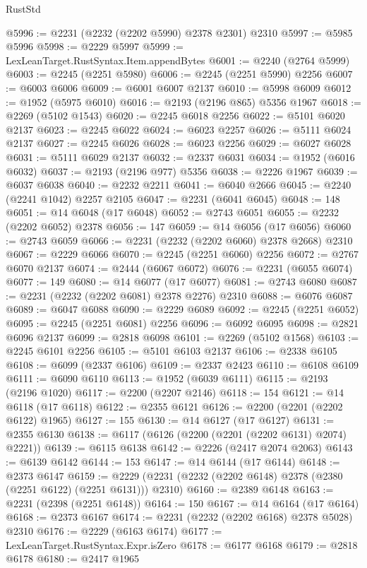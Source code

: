 \begin{lexlean}{RustStd}
\begin{coremodule}
@5996 := @2231 (@2232 (@2202 @5990) @2378 @2301) @2310
@5997 := @5985 @5996
@5998 := @2229 @5997
@5999 := LexLeanTarget.RustSyntax.Item.appendBytes
@6001 := @2240 (@2764 @5999)
@6003 := @2245 (@2251 @5980)
@6006 := @2245 (@2251 @5990) @2256
@6007 := @6003 @6006
@6009 := @6001 @6007 @2137
@6010 := @5998 @6009
@6012 := @1952 (@5975 @6010)
@6016 := @2193 (@2196 @865) @5356 @1967
@6018 := @2269 (@5102 @1543)
@6020 := @2245 @6018 @2256
@6022 := @5101 @6020 @2137
@6023 := @2245 @6022
@6024 := @6023 @2257
@6026 := @5111 @6024 @2137
@6027 := @2245 @6026
@6028 := @6023 @2256
@6029 := @6027 @6028
@6031 := @5111 @6029 @2137
@6032 := @2337 @6031
@6034 := @1952 (@6016 @6032)
@6037 := @2193 (@2196 @977) @5356
@6038 := @2226 @1967
@6039 := @6037 @6038
@6040 := @2232 @2211
@6041 := @6040 @2666
@6045 := @2240 (@2241 @1042) @2257 @2105
@6047 := @2231 (@6041 @6045)
@6048 := 148
@6051 := @14 @6048 (@17 @6048)
@6052 := @2743 @6051
@6055 := @2232 (@2202 @6052) @2378
@6056 := 147
@6059 := @14 @6056 (@17 @6056)
@6060 := @2743 @6059
@6066 := @2231 (@2232 (@2202 @6060) @2378 @2668) @2310
@6067 := @2229 @6066
@6070 := @2245 (@2251 @6060) @2256
@6072 := @2767 @6070 @2137
@6074 := @2444 (@6067 @6072)
@6076 := @2231 (@6055 @6074)
@6077 := 149
@6080 := @14 @6077 (@17 @6077)
@6081 := @2743 @6080
@6087 := @2231 (@2232 (@2202 @6081) @2378 @2276) @2310
@6088 := @6076 @6087
@6089 := @6047 @6088
@6090 := @2229 @6089
@6092 := @2245 (@2251 @6052)
@6095 := @2245 (@2251 @6081) @2256
@6096 := @6092 @6095
@6098 := @2821 @6096 @2137
@6099 := @2818 @6098
@6101 := @2269 (@5102 @1568)
@6103 := @2245 @6101 @2256
@6105 := @5101 @6103 @2137
@6106 := @2338 @6105
@6108 := @6099 (@2337 @6106)
@6109 := @2337 @2423
@6110 := @6108 @6109
@6111 := @6090 @6110
@6113 := @1952 (@6039 @6111)
@6115 := @2193 (@2196 @1020)
@6117 := @2200 (@2207 @2146)
@6118 := 154
@6121 := @14 @6118 (@17 @6118)
@6122 := @2355 @6121
@6126 := @2200 (@2201 (@2202 @6122) @1965)
@6127 := 155
@6130 := @14 @6127 (@17 @6127)
@6131 := @2355 @6130
@6138 := @6117 (@6126 (@2200 (@2201 (@2202 @6131) @2074) @2221))
@6139 := @6115 @6138
@6142 := @2226 (@2417 @2074 @2063)
@6143 := @6139 @6142
@6144 := 153
@6147 := @14 @6144 (@17 @6144)
@6148 := @2373 @6147
@6159 := @2229 (@2231 (@2232 (@2202 @6148) @2378 (@2380 (@2251 @6122) (@2251 @6131))) @2310)
@6160 := @2389 @6148
@6163 := @2231 (@2398 (@2251 @6148))
@6164 := 150
@6167 := @14 @6164 (@17 @6164)
@6168 := @2373 @6167
@6174 := @2231 (@2232 (@2202 @6168) @2378 @5028) @2310
@6176 := @2229 (@6163 @6174)
@6177 := LexLeanTarget.RustSyntax.Expr.isZero
@6178 := @6177 @6168
@6179 := @2818 @6178
@6180 := @2417 @1965

\end{coremodule}
\end{lexlean}
